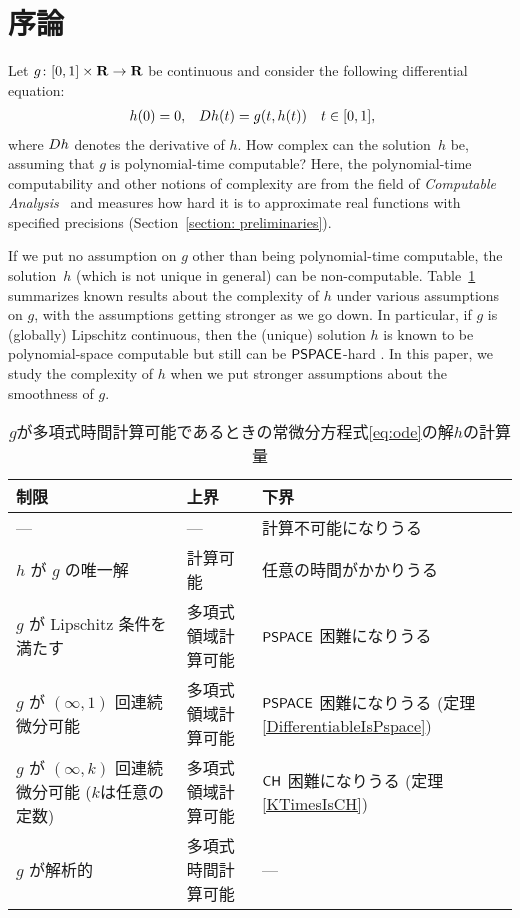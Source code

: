 \section{序論}

Let $g \colon [0,1] \times \mathbf R \to \mathbf R$ be continuous 
and consider the following differential equation: 
\begin{align}
 \label{eq:ode}
 h(0) & = 0, &
 D h(t) & = g(t,h(t)) \quad t \in [0,1], 
\end{align}
where $D h$ denotes the derivative of $h$. 
How complex can the solution~$h$ be, 
assuming that $g$ is polynomial-time computable? 
Here, the polynomial-time computability 
and other notions of complexity 
are from the field of 
\emph{Computable Analysis}~\cite{weihrauch00:_comput_analy}
and measures how hard it is to 
approximate real functions with specified precisions 
(Section~\ref{section: preliminaries}). 

If we put no assumption on $g$ other than being polynomial-time computable, 
the solution~$h$ (which is not unique in general) can be non-computable. 
Table~\ref{table:related} summarizes known results about 
the complexity of $h$ under various assumptions on $g$, 
with the assumptions getting stronger as we go down. 
In particular, if $g$ is (globally) Lipschitz continuous, 
then the (unique) solution $h$ is known to be 
polynomial-space computable but still can be 
$\mathsf{PSPACE}$-hard \cite{kawamura2010lipschitz}. 
In this paper, we study the complexity of $h$ 
when we put stronger assumptions about 
the smoothness of $g$. 

\begin{table}
\renewcommand\arraystretch{1.3}
\begin{center}
 \caption{$g$が多項式時間計算可能であるときの常微分方程式\eqref{eq:ode}の解$h$の計算量}
 \label{table:related}
 \begin{tabular}{lll}
  制限 & 上界 & 下界 \\
  \hline
   --- & --- & 計算不可能になりうる \cite{pour1979computable} \\
  $h$ が $g$ の唯一解 & 計算可能 \cite{coddington1955theory}
  & 任意の時間がかかりうる \cite{ko1983computational, miller1970recursive} \\
  $g$ が Lipschitz 条件を満たす & 多項式領域計算可能 \cite{ko1983computational}
      &	$\mathsf{PSPACE}$ 困難になりうる \cite{kawamura2010lipschitz}\\
  $g$ が $(\infty, 1)$ 回連続微分可能 & 多項式領域計算可能 & \parbox[t]{14zw}{$\mathsf{PSPACE}$ 困難になりうる\\{}(定理\ref{DifferentiableIsPspace})} \\
  \parbox[t]{14zw}{$g$ が $(\infty, k)$ 回連続微分可能\\{}($k$は任意の定数)}
  & 多項式領域計算可能 & \parbox[t]{14zw}{$\mathsf{CH}$ 困難になりうる\\{}(定理\ref{KTimesIsCH})} \\
  $g$ が解析的 
  & 多項式時間計算可能 \cite{muller1987uniform, ko1988computing, kawamura2010complexity} 
  & ---
 \end{tabular}
\end{center}
\end{table}

